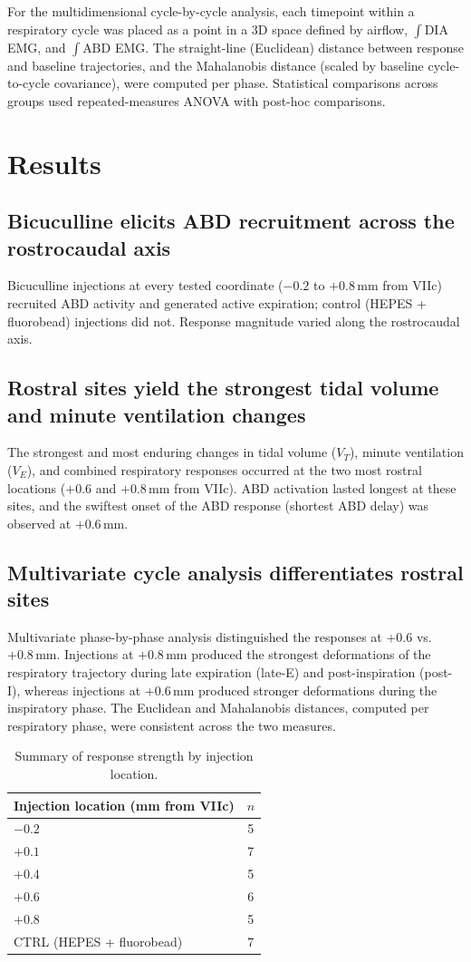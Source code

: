 \documentclass[11pt]{article}
\begin{document}
For the multidimensional cycle-by-cycle analysis, each timepoint within a respiratory cycle was placed as a point in a 3D space defined by airflow, $\int$DIA EMG, and $\int$ABD EMG. The straight-line (Euclidean) distance between response and baseline trajectories, and the Mahalanobis distance (scaled by baseline cycle-to-cycle covariance), were computed per phase. Statistical comparisons across groups used repeated-measures ANOVA with post-hoc comparisons.

\section{Results}
\subsection{Bicuculline elicits ABD recruitment across the rostrocaudal axis}
Bicuculline injections at every tested coordinate ($-0.2$ to $+0.8$\,mm from VIIc) recruited ABD activity and generated active expiration; control (HEPES + fluorobead) injections did not. Response magnitude varied along the rostrocaudal axis.

\subsection{Rostral sites yield the strongest tidal volume and minute ventilation changes}
The strongest and most enduring changes in tidal volume ($V_T$), minute ventilation ($V_E$), and combined respiratory responses occurred at the two most rostral locations ($+0.6$ and $+0.8$\,mm from VIIc). ABD activation lasted longest at these sites, and the swiftest onset of the ABD response (shortest ABD delay) was observed at $+0.6$\,mm.

\subsection{Multivariate cycle analysis differentiates rostral sites}
Multivariate phase-by-phase analysis distinguished the responses at $+0.6$ vs.\ $+0.8$\,mm. Injections at $+0.8$\,mm produced the strongest deformations of the respiratory trajectory during late expiration (late-E) and post-inspiration (post-I), whereas injections at $+0.6$\,mm produced stronger deformations during the inspiratory phase. The Euclidean and Mahalanobis distances, computed per respiratory phase, were consistent across the two measures.

\begin{table}[h]
\centering
\caption{Summary of response strength by injection location.}
\begin{tabular}{lc}
\toprule
Injection location (mm from VIIc) & $n$ \\
\midrule
$-0.2$ & 5 \\
$+0.1$ & 7 \\
$+0.4$ & 5 \\
$+0.6$ & 6 \\
$+0.8$ & 5 \\
CTRL (HEPES + fluorobead) & 7 \\
\bottomrule
\end{tabular}
\end{table}
\end{document}
